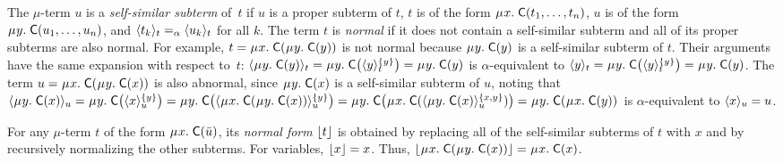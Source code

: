 The $\mu$-term $u$
is a \emph{self-similar subterm} of~$t$ if
$u$ is a proper subterm of $t$,
$t$ is of the form $\MU x.\; \const{C}( t_1, \ldots, t_n )$,
$u$ is of the form $\MU y.\; \const{C}( u_1, \ldots, u_n )$,
and $\expand{t}{ t_k } \aequiv \expand{t}{ u_k }$ for all $k$. %
The term $t$ is \emph{normal} if it does not contain a self-similar subterm
and all of its proper subterms are also normal.
For example, $t = \MU x.\; \const{C}( \MU y.\; \const{C}( y ) )$ is not normal
because $\MU y.\; \const{C}( y )$ is a self-similar subterm of $t$.
Their arguments have the same expansion with respect to~$t$:
$\expand{t}{\MU y.\; \const{C}( y )} =
\MU y.\; \const{C}\bigl( \expand{t}{y}^{\smash{\{y\}}} \bigr) =
\MU y.\; \const{C}( y )$
is $\alpha$-equivalent to
$\expand{t}{y} =
\MU y.\; \const{C}\bigl( \expand{t}{y}^{\smash{\{y\}}} \bigr) =
\MU y.\; \const{C}( y )$.
The term $u = \MU x.\; \const{C}( \MU y.\; \const{C}( x ) )$ is also abnormal,
since $\MU y.\; \const{C}( x )$ is a self-similar subterm of $u$,
noting that
%
$\expand{u}{\MU y.\; \const{C}( x )}
 = \MU y.\; \const{C}\bigl( \expand{u}{x}^{\smash{\{y\}}} \bigr)
 = \MU y.\; \const{C}\bigl( \expand{u}{\MU x.\; \const{C}( \MU y.\; \const{C}( x ) ) }^{\smash{\{y\}}} \bigr)
 = \MU y.\; \const{C}\bigl( \MU x.\; \const{C}( \expand{u}{\MU y.\; \const{C}( x )}^{\smash{\{x,y\}}} ) \bigr)
 = \MU y.\allowbreak\; \const{C}( \MU x.\allowbreak\; \const{C}( y ) )$
is $\alpha$-equivalent to $\expand{u}{x} = u$.

For any $\mu$-term $t$ of the form $\MU x.\; \const C( \vec u )$,
its \emph{normal form} $\nf{t}$ is obtained
by replacing all of the self-similar subterms of $t$ with $x$
and by recursively normalizing the other subterms.
For variables, $\nf{x} = x$.
Thus, $\nf{\MU x.\; \const{C}( \MU y.\; \const{C}( x ) )} = \MU x.\; \const{C}( x )$.

